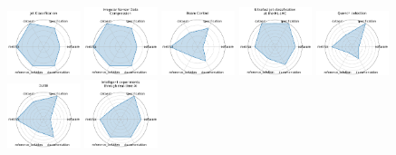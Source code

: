 \begin{figure}[ht!]
\centering
\includegraphics[width=0.1900\textwidth]{images/jet_classification_radar.pdf}
\includegraphics[width=0.1900\textwidth]{images/irregular_sensor_data_compression_radar.pdf}
\includegraphics[width=0.1900\textwidth]{images/beam_control_radar.pdf}
\includegraphics[width=0.1900\textwidth]{images/ultrafast_jet_classification_at_the_hl-lhc_radar.pdf}
\includegraphics[width=0.1900\textwidth]{images/quench_detection_radar.pdf}
\\[1ex]
\includegraphics[width=0.1900\textwidth]{images/dune_radar.pdf}
\includegraphics[width=0.1900\textwidth]{images/intelligent_experiments_through_real-time_ai_radar.pdf}

\end{figure}
